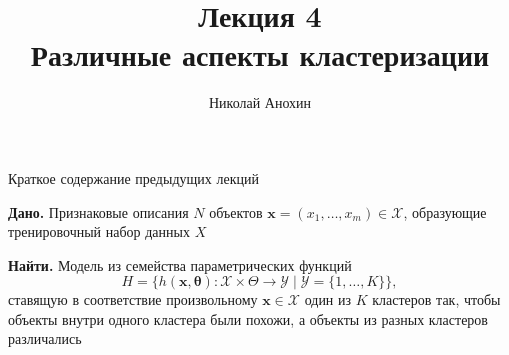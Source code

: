 \documentclass[aspectratio=169]{beamer}
\author{Николай Анохин}
\title{\newline \newline \newline Лекция 4 \\ Различные аспекты кластеризации}
\let\otp\titlepage
\renewcommand{\titlepage}{\otp\addtocounter{framenumber}{-1}}
\begin{document}
\begin{frame}[plain]
\titlepage
\end{frame}

\begin{frame}{Краткое содержание предыдущих лекций}

\vspace{1em}
{\bf Дано.} Признаковые описания $N$ объектов $\mathbf{x} = (x_1, \ldots, x_m) \in \mathcal{X}$, образующие тренировочный набор данных $X$

\vspace{1em}
{\bf Найти.} Модель из семейства параметрических функций 
\[
H = \{h(\mathbf{x, \mathbf{\theta}}): \mathcal{X} \times \Theta \rightarrow \mathcal{Y} \mid \mathcal{Y} = \{1, \ldots, K\}\},
\]
ставящую в соответствие произвольному $\mathbf{x} \in \mathcal{X}$ один из $K$ кластеров так, чтобы объекты внутри одного кластера были похожи, а объекты из разных кластеров различались

\end{frame}
\end{document}
